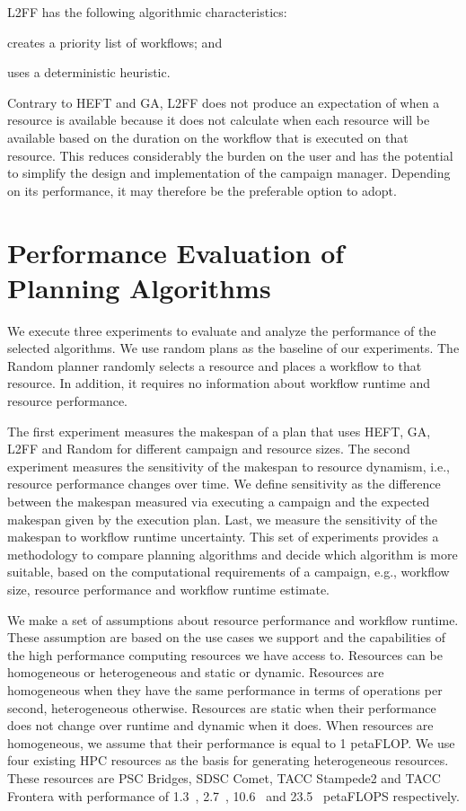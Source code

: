 L2FF has the following algorithmic characteristics:
\begin{inparaenum}[(1)]
    \item creates a priority list of workflows; and
    \item uses a deterministic heuristic.
\end{inparaenum}
Contrary to HEFT and GA, L2FF does not produce an expectation of when a resource
is available because it does not calculate when each resource will be available
based on the duration on the workflow that is executed on that resource. This
reduces considerably the burden on the user and has the potential to simplify
the design and implementation of the campaign manager. Depending on its
performance, it may therefore be the preferable option to adopt.

\section{Performance Evaluation of Planning Algorithms}
\label{sec:algo_perf_comp}

We execute three experiments to evaluate and analyze the performance of the
selected algorithms. We use random plans as the baseline of our experiments.
The Random planner randomly selects a resource and places a workflow to that
resource. In addition, it requires no information about workflow runtime and
resource performance.

The first experiment measures the makespan of a plan that uses HEFT, GA, L2FF
and Random for different campaign and resource sizes. The second experiment
measures the sensitivity of the makespan to resource dynamism, i.e., resource
performance changes over time. We define sensitivity as the difference between
the makespan measured via executing a campaign and the expected makespan given
by the execution plan. Last, we measure the sensitivity of the makespan to
workflow runtime uncertainty. This set of experiments provides a methodology to
compare planning algorithms and decide which algorithm is more suitable, based
on the computational requirements of a campaign, e.g., workflow size, resource
performance and workflow runtime estimate.

We make a set of assumptions about resource performance and workflow runtime.
These assumption are based on the use cases we support and the capabilities of
the high performance computing resources we have access to. Resources can be
homogeneous or heterogeneous and static or dynamic. Resources are homogeneous
when they have the same performance in terms of operations per second,
heterogeneous otherwise. Resources are static when their performance does not
change over runtime and dynamic when it does. When resources are homogeneous, we
assume that their performance is equal to 1 petaFLOP. We use four existing HPC
resources as the basis for generating heterogeneous resources. These resources
are PSC Bridges, SDSC Comet, TACC Stampede2 and TACC Frontera with
performance of 1.3~\cite{bridges_perf}, 2.7~\cite{comet_perf}, 10.6~\cite{top500}
and 23.5~\cite{top500} petaFLOPS respectively.

